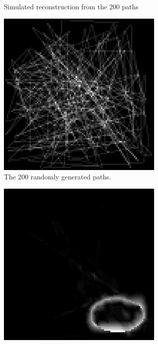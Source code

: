 \documentclass[english]{article}\usepackage[]{graphicx}\usepackage[]{color}
\begin{document}
\begin{figure}
\begin{subfigure}{.22\textwidth}
  \caption{Simulated reconstruction from the 200 paths}
  \vspace{0pt}
  \label{fig:adp_randpaths_sim_rec}
\end{subfigure}%
\hspace{10pt}
\begin{subfigure}{.22\textwidth}
  \centering
    \includegraphics[width=1\linewidth]{figures/nonadaptiveresultpath}
  \caption{The 200 randomly generated paths.}
  \vspace{0pt}
  \label{fig:adp_randpaths_sim}
\end{subfigure}%
\hspace {10pt}
\begin{subfigure}{.22\textwidth}
  \centering
    \includegraphics[width=1\linewidth]{figures/nonadaptiveresulterror}

\end{subfigure}
\end{figure}
\end{document}
